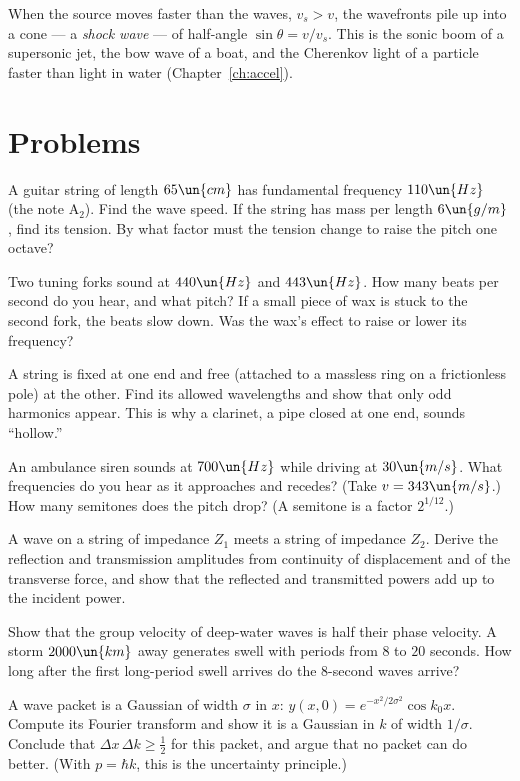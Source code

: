 When the source moves faster than the waves, $v_s>v$, the wavefronts pile up into a cone --- a \emph{shock wave} --- of half-angle $\sin\theta = v/v_s$. This is the sonic boom of a supersonic jet, the bow wave of a boat, and the Cherenkov light of a particle faster than light in water (Chapter~\ref{ch:accel}).

\section{Problems}

\begin{problems}
\core A guitar string of length $65\un{cm}$ has fundamental frequency $110\un{Hz}$ (the note A$_2$). Find the wave speed. If the string has mass per length $6\un{g/m}$, find its tension. By what factor must the tension change to raise the pitch one octave?

 Two tuning forks sound at $440\un{Hz}$ and $443\un{Hz}$. How many beats per second do you hear, and what pitch? If a small piece of wax is stuck to the second fork, the beats slow down. Was the wax's effect to raise or lower its frequency?

 A string is fixed at one end and free (attached to a massless ring on a frictionless pole) at the other. Find its allowed wavelengths and show that only odd harmonics appear. This is why a clarinet, a pipe closed at one end, sounds ``hollow.''

 An ambulance siren sounds at $700\un{Hz}$ while driving at $30\un{m/s}$. What frequencies do you hear as it approaches and recedes? (Take $v=343\un{m/s}$.) How many semitones does the pitch drop? (A semitone is a factor $2^{1/12}$.)

\core A wave on a string of impedance $Z_1$ meets a string of impedance $Z_2$. Derive the reflection and transmission amplitudes from continuity of displacement and of the transverse force, and show that the reflected and transmitted powers add up to the incident power.

 Show that the group velocity of deep-water waves is half their phase velocity. A storm $2000\un{km}$ away generates swell with periods from $8$ to $20$ seconds. How long after the first long-period swell arrives do the $8$-second waves arrive?

\core A wave packet is a Gaussian of width $\sigma$ in $x$: $y(x,0) = e^{-x^2/2\sigma^2}\cos k_0x$. Compute its Fourier transform and show it is a Gaussian in $k$ of width $1/\sigma$. Conclude that $\Delta x\,\Delta k\ge\tfrac12$ for this packet, and argue that no packet can do better. (With $p = \hbar k$, this is the uncertainty principle.)


\end{problems}
